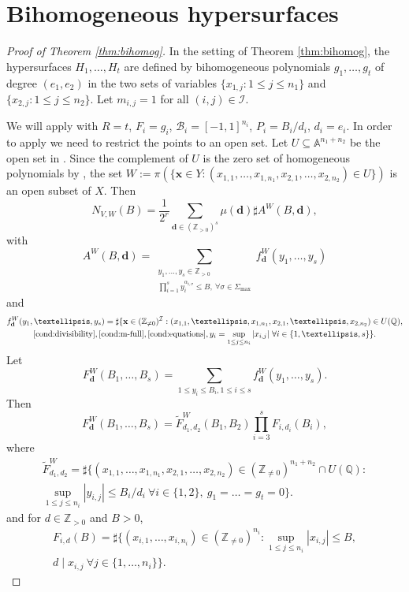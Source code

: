 \documentclass[10pt, a4paper, reqno, english]{amsart}
\newcommand\ZZ{\mathbb{Z}}
\newcommand\QQ{\mathbb{Q}}
\newcommand{\A}{\mathbb{A}} %
\newcommand{\indexset}{{\mathcal I}} %
\theoremstyle{definition}
\numberwithin{theorem}{section}
\numberwithin{equation}{section}
\begin{document}
\section{Bihomogeneous hypersurfaces}
\label{sec:bihomog}
\begin{proof}[Proof of Theorem \ref{thm:bihomog}]
In the setting of Theorem \ref{thm:bihomog}, the hypersurfaces $H_1,\dots,H_t$ are defined by bihomogeneous polynomials $g_1, \dots,g_t$ of degree $(e_1,e_2)$ in the two sets of variables $\{x_{1,j}:1\leq j\leq n_1\}$ and $\{x_{2,j}:1\leq j\leq n_2\}$. Let $m_{i,j}=1$ for all $(i,j)\in\indexset$.

 We will apply \cite[Theorem 4.4]{Sch} with $R=t$, $F_i=g_i$, $\mathscr B_i=[-1,1]^{n_i}$, $P_i=B_i/d_i$, $d_i=e_i$.
In order to apply  \cite[Theorem 4.4]{Sch} we need to restrict the points to an open set. 	 
	Let $U\subseteq \A^{n_1+n_2}$ be the open set in \cite[Theorem 4.4]{Sch}. Since the complement of $U$ is the zero set of homogeneous polynomials by \cite[Theorems 4.1, 4.2]{Sch}, the set $W:=\pi(\{\mathbf x\in Y: (x_{1,1},\dots, x_{1,n_1},x_{2,1},\dots,x_{2,n_2})\in U\})$ is an open subset of $X$. 
	Then $$N_{V,W}(B)=\frac 1{2^r}\sum_{\mathbf d\in(\ZZ_{>0})^s}\mu(\mathbf d)\sharp A^W(B,\mathbf d),$$ with
	$$A^W(B,\mathbf d)=\sum_{\substack{y_1,\dots,y_s\in\ZZ_{>0}\\ \prod_{i=1}^s y_i^{\alpha_{i,\sigma}}\leq B,\ \forall \sigma\in\Sigma_{\max}}}f^W_{\mathbf d}(y_1,\dots,y_s)$$ and 
	\begin{multline*}
	f^W_{\mathbf d}(y_1,\dots,y_s)=\sharp\{\mathbf x\in(\ZZ_{\neq 0})^{\indexset}: 
	(x_{1,1},\dots,x_{1,n_1}, x_{2,1},\dots,x_{2,n_2}) \in U(\QQ), \\
	\eqref{cond:divisibility},\eqref{cond:m-full},\eqref{cond:equations},
	y_i=\sup_{1\leq j\leq n_{i}}|x_{i,j}| \ \forall i\in\{1,\dots,s\} \}.
	\end{multline*}
	Let $$F^W_{\mathbf d}(B_1,\dots,B_s)=\sum_{1\leq y_i\leq B_i,1\leq i\leq s}f^W_{\mathbf d}(y_1,\dots,y_s).$$
	Then $$ F^W_{\mathbf d}(B_1,\dots,B_s)
	=\widetilde F^W_{d_1,d_2}(B_1,B_2)\prod_{i=3}^sF_{i,d_i}(B_i),
	$$
	where 	
	\begin{multline*}
	\widetilde F_{d_1,d_2}^W=\sharp\{(x_{1,1},\dots,x_{1,n_1}, x_{2,1},\dots,x_{2,n_2})\in(\ZZ_{\neq 0})^{n_1+n_2}\cap U(\QQ): \\
	 \sup_{1\leq j\leq n_{i}}|y_{i,j}|\leq B_i/d_i \ \forall i\in\{1,2\}, \ g_1=\dots=g_t=0
	  \}.
	  \end{multline*}
	 and for $d\in\ZZ_{>0}$ and $B>0$,
	 \begin{multline*}
	F_{i,d}(B)=\sharp\{(x_{i,1},\dots,x_{i,n_i})\in(\ZZ_{\neq 0})^{n_i}: 
	 \sup_{1\leq j\leq n_{i}}|x_{i,j}|\leq B, \\
	 d\mid x_{i,j} \ \forall j\in\{1,\dots,n_i\}
	 \}.
	 \end{multline*}
	 

\end{proof}
\end{document}
